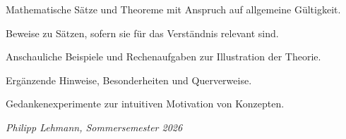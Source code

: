 \begin{satzbox}[Beispiel]
  Mathematische Sätze und Theoreme mit Anspruch auf allgemeine Gültigkeit.
\end{satzbox}

\begin{beweisbox}[Beispiel]
  Beweise zu Sätzen, sofern sie für das Verständnis relevant sind.
\end{beweisbox}

\begin{exercisebox}[Beispiel]
  Anschauliche Beispiele und Rechenaufgaben zur Illustration der Theorie.
\end{exercisebox}

\begin{bemerkungbox}[Beispiel]
  Ergänzende Hinweise, Besonderheiten und Querverweise.
\end{bemerkungbox}

\begin{gedankenbox}[Beispiel]
  Gedankenexperimente zur intuitiven Motivation von Konzepten.
\end{gedankenbox}

\vfill
\begin{flushright}
  \textit{Philipp Lehmann, Sommersemester 2026}
\end{flushright}
